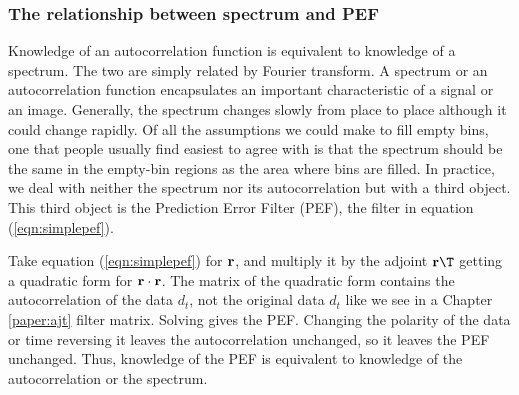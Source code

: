 \subsubsection{The relationship between spectrum and PEF}
Knowledge of an autocorrelation function
is equivalent to knowledge of a spectrum.
The two are simply related by Fourier transform.
A spectrum or an autocorrelation function encapsulates
an important characteristic of a signal or an image.
Generally, the spectrum changes slowly from place to place
although it could change rapidly.
Of all the assumptions we could make to fill empty bins,
one that people usually find easiest to agree with is that
the spectrum should be the same
in the empty-bin regions as the area where bins are filled.
In practice,
we deal with neither the spectrum
nor its autocorrelation but with a third object.
This third object is the Prediction Error Filter (PEF),
the filter in equation (\ref{eqn:simplepef}).
\par
Take equation  (\ref{eqn:simplepef}) for $\bold r$,
and multiply it by the adjoint $\bold r\T$ getting a quadratic form for $\bold r\cdot\bold r$.
The matrix of the quadratic form contains the autocorrelation of the data $d_t$,
not the original data $d_t$ like we see in a Chapter \ref{paper:ajt} filter matrix.
Solving gives the PEF.
Changing the polarity of the data or time reversing it
leaves the autocorrelation unchanged,
so it leaves the PEF unchanged.
Thus,
knowledge of the PEF is equivalent to knowledge of the autocorrelation or the spectrum.

